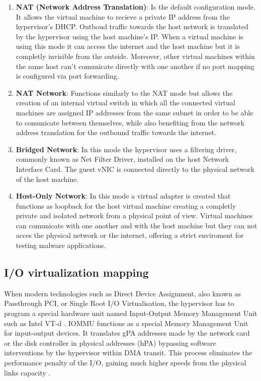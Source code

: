 \begin{enumerate}
    \item \textbf{NAT (Network Address Translation)}: Is the default configuration mode. It allows the virtual machine to recieve a private IP address from the hypervisor's DHCP. Outboud traffic towards the host network is translated by the hypervisor using the host machine's IP. When a virtual machine is using this mode it can access the internet and the host machine but it is completly invisible from the outside. Moreover, other virtual machines within the same host can't comunicate directly with one another if no port mapping is configured via port forwarding. \cite{implementation-of-internetworking-with-host-internet-in-oracle-virtualbox-guest-virtual-machines.pdf}

    \item \textbf{NAT Network}: Functions similarly to the NAT mode but allows the creation of an internal virtual switch in which all the connected virtual machines are assigned IP addresses from the same subnet in order to be able to comunicate between themselves, while also benefiting from the network address translation for the outbound traffic towards the internet. \cite{implementation-of-internetworking-with-host-internet-in-oracle-virtualbox-guest-virtual-machines.pdf}
    
    \item \textbf{Bridged Network}: In this mode the hypervisor uses a filtering driver, commonly known as Net Filter Driver, installed on the host Network Interface Card. The guest vNIC is connected directly to the physical network of the host machine. \cite{implementation-of-internetworking-with-host-internet-in-oracle-virtualbox-guest-virtual-machines.pdf}

    \item \textbf{Host-Only Network}: In this mode a virtual adapter is created that functions as loopback for the host virtual machine creating a completly private and isolated network from a physical point of view. Virtual machines can comunicate with one another and with the host machine but they can not acces the physical network or the internet, offering a strict enviroment for testing malware applications. \cite{implementation-of-internetworking-with-host-internet-in-oracle-virtualbox-guest-virtual-machines.pdf}
    \end{enumerate}

\subsection{I/O virtualization mapping}
When modern technologies such as Direct Device Assignment, also known as Passthrough PCI, or Single Root I/O Virtualisation, the hypervisor has to program a special hardware unit named Input-Output Memory Management Unit such as Intel VT-d \cite{smith2005virtual}. IOMMU functions as a special Memory Management Unit for input-output devices. It translates gPA addresses made by the network card or the disk controller in physical addresses (hPA) bypassing software interventions by the hypervisor within DMA transit. This process eliminates the performance penalty of the I/O, gaining much higher speeds from the physical links capacity \cite{smith2005virtual}.